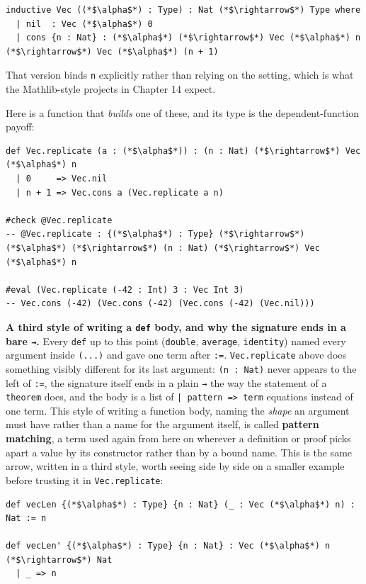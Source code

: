 \begin{lstlisting}
inductive Vec ((*$\alpha$*) : Type) : Nat (*$\rightarrow$*) Type where
  | nil  : Vec (*$\alpha$*) 0
  | cons {n : Nat} : (*$\alpha$*) (*$\rightarrow$*) Vec (*$\alpha$*) n (*$\rightarrow$*) Vec (*$\alpha$*) (n + 1)
\end{lstlisting}

That version binds \texttt{n} explicitly rather than relying on the setting, which is what the Mathlib-style projects in Chapter 14 expect.

Here is a function that \emph{builds} one of these, and its type is the dependent-function payoff:

\begin{lstlisting}
def Vec.replicate (a : (*$\alpha$*)) : (n : Nat) (*$\rightarrow$*) Vec (*$\alpha$*) n
  | 0     => Vec.nil
  | n + 1 => Vec.cons a (Vec.replicate a n)

#check @Vec.replicate
-- @Vec.replicate : {(*$\alpha$*) : Type} (*$\rightarrow$*) (*$\alpha$*) (*$\rightarrow$*) (n : Nat) (*$\rightarrow$*) Vec (*$\alpha$*) n

#eval (Vec.replicate (-42 : Int) 3 : Vec Int 3)
-- Vec.cons (-42) (Vec.cons (-42) (Vec.cons (-42) (Vec.nil)))
\end{lstlisting}

\textbf{A third style of writing a \texttt{def} body, and why the signature ends in a bare \texttt{→}.} Every \texttt{def} up to this point (\texttt{double}, \texttt{average}, \texttt{identity}) named every argument inside \texttt{(...)} and gave one term after \texttt{:=}. \texttt{Vec.replicate} above does something visibly different for its last argument: \texttt{(n : Nat)} never appears to the left of \texttt{:=}, the signature itself ends in a plain \texttt{→} the way the statement of a \texttt{theorem} does, and the body is a list of \texttt{| pattern => term} equations instead of one term. This style of writing a function body, naming the \emph{shape} an argument must have rather than a name for the argument itself, is called \textbf{pattern matching}, a term used again from here on wherever a definition or proof picks apart a value by its constructor rather than by a bound name. This is the same arrow, written in a third style, worth seeing side by side on a smaller example before trusting it in \texttt{Vec.replicate}:

\begin{lstlisting}
def vecLen {(*$\alpha$*) : Type} {n : Nat} (_ : Vec (*$\alpha$*) n) : Nat := n

def vecLen' {(*$\alpha$*) : Type} {n : Nat} : Vec (*$\alpha$*) n (*$\rightarrow$*) Nat
  | _ => n
\end{lstlisting}

